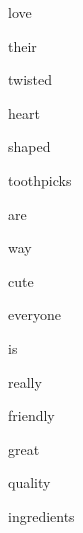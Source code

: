 \documentclass[varwidth]{standalone}
\begin{document}
 \begin{CJK*}{UTF8}{gbsn} 
{\setlength{\fboxsep}{0pt}\colorbox{white!0}{\parbox{0.9\textwidth}{
\colorbox{red!7.20529317855835}{\strut love} 
\colorbox{red!26.73208999633789}{\strut their} 
\colorbox{red!17.29389762878418}{\strut twisted} 
\colorbox{red!18.795555114746094}{\strut heart} 
\colorbox{red!100.0}{\strut shaped} 
\colorbox{red!68.5958251953125}{\strut toothpicks} 
\colorbox{red!30.87969970703125}{\strut are} 
\colorbox{red!8.855355262756348}{\strut way} 
\colorbox{red!38.28738784790039}{\strut cute} 
\colorbox{red!15.015019416809082}{\strut everyone} 
\colorbox{red!19.162078857421875}{\strut is} 
\colorbox{red!0.0}{\strut really} 
\colorbox{red!54.50091552734375}{\strut friendly} 
\colorbox{red!8.225984573364258}{\strut great} 
\colorbox{red!34.68598937988281}{\strut quality} 
\colorbox{red!12.42318344116211}{\strut ingredients} 

}}}\end{CJK*}
\end{document}
